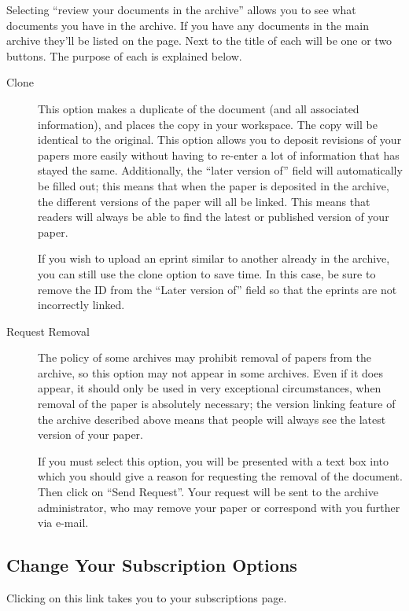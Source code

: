 Selecting ``review your documents in the archive'' allows you to see what documents you have in the archive. If you have any documents in the main archive they'll be listed on the page. Next to the title of each will be one or two buttons. The purpose of each is explained below.

\begin{description}

\item[Clone]

This option makes a duplicate of the document (and all associated information), and places the copy in your workspace. The copy will be identical to the original. This option allows you to deposit revisions of your papers more easily without having to re-enter a lot of information that has stayed the same. Additionally, the ``later version of'' field will automatically be filled out; this means that when the paper is deposited in the archive, the different versions of the paper will all be linked. This means that readers will always be able to find the latest or published version of your paper.

If you wish to upload an eprint similar to another already in the archive, you can still use the clone option to save time. In this case, be sure to remove the ID from the ``Later version of'' field so that the eprints are not incorrectly linked.


\item[Request Removal]

The policy of some archives may prohibit removal of papers from the archive, so this option may not appear in some archives. Even if it does appear, it should only be used in very exceptional circumstances, when removal of the paper is absolutely necessary; the version linking feature of the archive described above means that people will always see the latest version of your paper.

If you must select this option, you will be presented with a text box into which you should give a reason for requesting the removal of the document. Then click on ``Send Request''. Your request will be sent to the archive administrator, who may remove your paper or correspond with you further via e-mail.

\end{description}


\subsection{Change Your Subscription Options}

Clicking on this link takes you to your subscriptions page.
